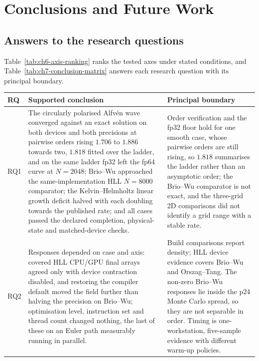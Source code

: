 
\chapter{Conclusions and Future Work}
\label{chap:conclusions}

\section{Answers to the research questions}

Table~\ref{tab:ch6-axis-ranking} ranks the tested axes under stated conditions,
and Table~\ref{tab:ch7-conclusion-matrix} answers each research question with
its principal boundary.

\begin{table}[H]
\centering
\small
\begin{tabularx}{\textwidth}{@{}p{}XX@{}}
\toprule
RQ & Supported conclusion & Principal boundary \\
\midrule
RQ1 & The circularly polarised Alfv\'en wave converged against an exact
solution on both devices and both precisions at pairwise orders rising $1.706$
to $1.886$ towards two, $1.818$ fitted over the ladder, and on the same ladder
fp32 left the fp64 curve at $N=2048$; Brio--Wu approached the same-implementation
HLL $N=8000$ comparator; the Kelvin--Helmholtz linear growth deficit halved
with each doubling towards the published rate; and all cases passed the
declared completion, physical-state and matched-device checks. & Order
verification and the fp32 floor hold for one smooth case, whose pairwise orders
are still rising, so $1.818$ summarises the ladder rather than an asymptotic
order; the Brio--Wu comparator is not exact, and the three-grid 2D comparisons
did not identify a grid range with a stable rate. \\
RQ2 & Responses depended on case and axis: covered HLL CPU/GPU final arrays
agreed only with device contraction disabled, and restoring the compiler
default moved the field further than halving the precision on Brio--Wu;
optimisation level, instruction set and thread count changed nothing, the last
of these on an Euler path measurably running in parallel. & Build comparisons
report density; HLL device evidence covers Brio--Wu and Orszag--Tang. The
non-zero Brio--Wu responses lie inside the p24 Monte Carlo spread, so they are
not separable in order. Timing is one-workstation, five-sample evidence with
different warm-up policies. \\

\end{tabularx}
\end{table}
